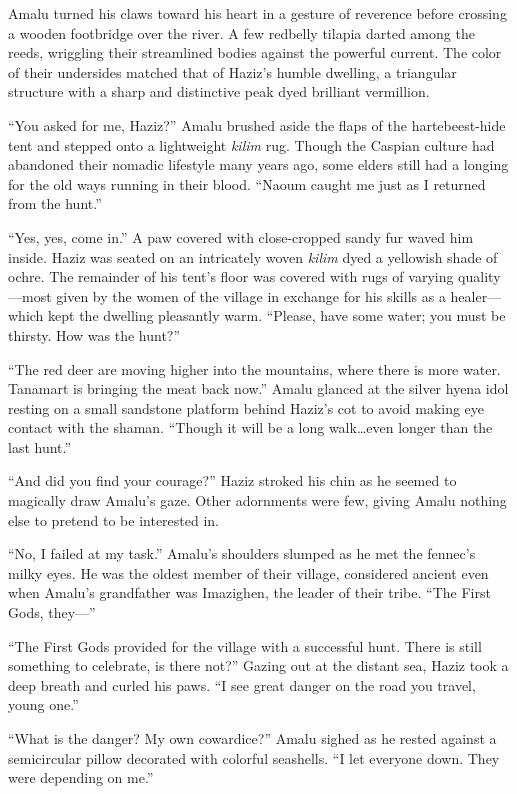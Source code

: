 Amalu turned his claws toward his heart in a gesture of reverence before crossing a wooden footbridge over the river. A few redbelly tilapia darted among the reeds, wriggling their streamlined bodies against the powerful current. The color of their undersides matched that of Haziz's humble dwelling, a triangular structure with a sharp and distinctive peak dyed brilliant vermillion.

``You asked for me, Haziz?'' Amalu brushed aside the flaps of the hartebeest-hide tent and stepped onto a lightweight \emph{kilim} rug. Though the Caspian culture had abandoned their nomadic lifestyle many years ago, some elders still had a longing for the old ways running in their blood. ``Naoum caught me just as I returned from the hunt.''

``Yes, yes, come in.'' A paw covered with close-cropped sandy fur waved him inside. Haziz was seated on an intricately woven \emph{kilim} dyed a yellowish shade of ochre. The remainder of his tent's floor was covered with rugs of varying quality---most given by the women of the village in exchange for his skills as a healer---which kept the dwelling pleasantly warm. ``Please, have some water; you must be thirsty. How was the hunt?''

``The red deer are moving higher into the mountains, where there is more water. Tanamart is bringing the meat back now.'' Amalu glanced at the silver hyena idol resting on a small sandstone platform behind Haziz's cot to avoid making eye contact with the shaman. ``Though it will be a long walk\ldots even longer than the last hunt.''

``And did you find your courage?'' Haziz stroked his chin as he seemed to magically draw Amalu's gaze. Other adornments were few, giving Amalu nothing else to pretend to be interested in.

``No, I failed at my task.'' Amalu's shoulders slumped as he met the fennec's milky eyes. He was the oldest member of their village, considered ancient even when Amalu's grandfather was Imazighen, the leader of their tribe. ``The First Gods, they---''

``The First Gods provided for the village with a successful hunt. There is still something to celebrate, is there not?'' Gazing out at the distant sea, Haziz took a deep breath and curled his paws. ``I see great danger on the road you travel, young one.''

``What is the danger? My own cowardice?'' Amalu sighed as he rested against a semicircular pillow decorated with colorful seashells. ``I let everyone down. They were depending on me.''

